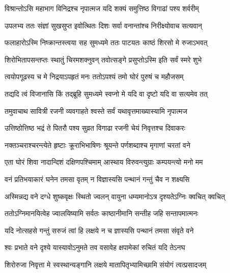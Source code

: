 \begin{center}
\twolineshloka
{विश्रान्तोऽसि महाभाग विनिद्रश्च नृपात्मज}
{यदि शक्यं समुत्तिष्ठ विगाढां पश्य शर्वरीम्}




\twolineshloka
{उपलभ्य ततः संज्ञां सुखसुप्त इवोत्थितः}
{दिशः सर्वा वनान्तांश्च निरीक्ष्योवाच सत्यवान्}


\twolineshloka
{फलाहारोऽस्मि निष्क्रान्तस्त्वया सह सुमध्यमे}
{ततः पाटयतः काष्ठं शिरसो मे रुजाऽभवत्}


\twolineshloka
{शिरोभितापसन्तप्तः स्थातुं चिरमशक्नुवन्}
{तवोत्सङ्गे प्रसुप्तोऽस्मि इति सर्वं स्मरे शुभे}


\twolineshloka
{त्वयोपगूढस्य च मे निद्रयाऽपहृतं मनः}
{ततोऽपश्यं तमो घोरं पुरुषं च महौजसम्}


\twolineshloka
{तद्यदि त्वं विजानासि किं तद्ब्रूहि सुमध्यमे}
{स्वप्नो मे यदि वा दृष्टो यदि वा सत्यमेव तत्}


\twolineshloka
{तमुवाचाथ सावित्री रजनी व्यवगाहते}
{श्वस्ते सर्वं यथावृत्तमाख्यास्यामि नृपात्मज}


\twolineshloka
{उत्तिष्ठोत्तिष्ठ भद्रं ते पितरौ पश्य सुव्रत}
{विगाढा रजनी चेयं निवृत्तश्च दिवाकरः}


\twolineshloka
{नक्तञ्चराश्चरन्त्येते हृष्टाः क्रूराभिभाषिणः}
{श्रूयन्ते पर्णशब्दाश्च मृगाणां चरतां वने}


\twolineshloka
{एता घोरं शिवा नादान्दिशं दक्षिणपश्चिमाम्}
{आस्थाय विरुवन्त्युग्राः कम्पयन्त्यो मनो मम}




\twolineshloka
{वनं प्रतिभयाकारं घनेन तमसा वृतम्}
{न विज्ञास्यसि पन्थानं गन्तुं चैव न शक्ष्यसि}




\twolineshloka
{अस्मिन्नद्य वने दग्धे शुष्कवृक्षः स्थितो ज्वलन्}
{वायुना धम्यमानोऽत्र दृश्यतेऽग्निः क्वचित् क्वचित्}


\twolineshloka
{ततोऽग्निमानयित्वेह ज्वालयिष्यामि सर्वतः}
{काष्ठानीमानि सन्तीह जहि सन्तापमात्मनः}


\twolineshloka
{यदि नोत्सहसे गन्तुं सरुजं त्वां हि लक्षये}
{न च ज्ञास्यसि पन्थानं तमसा संवृते वने}


\twolineshloka
{श्वः प्रभाते वने दृश्ये यास्यावोऽनुमते तव}
{वसावेह क्षपामेकां रुचितं यदि तेऽनघ}




\twolineshloka
{शिरोरुजा निवृत्ता मे स्वस्थान्यङ्गानि लक्षये}
{मातापितृभ्यामिच्छामि संयोगं त्वत्प्रसादजम्}



\end{center}

